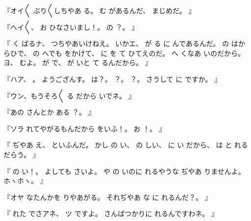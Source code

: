 『オイ〳〵
ぶり〳〵しちやあ
る。
む
があるんだ、
まじめだ。
』

『ヘイ〳〵、
お
ひなさいまし！。
の
？。
』

『
く
ばるナ、
つちやあいけねえ。
いかエ、
が
る
に
んであるんだ。
の
はからひで、
の
へでも
をかけて、
に
を
て
ひてえのだ。
へ
くなあ
いのだから。
ヨ、
むよ。
が
で、
が
いと
て
るんだから。
』

『ハア、
。
ようござんす。
は？。
？。
？。
さうして
に
ですか。
』

『ウン、もうそろ〳〵
る
だから
いでネ。
』

『あの
さんとか
ある
？。
』

『ソラ
れてやがるもんだから
をいふ！。
お
！。
』

『
ぢやあ
え、
といふんだ。
かし
の
い、
の
しい、
に
い
だから、
は
と
れるだらう。
』

『
の
い！。
よしても
さいよ。
や
の
いのに
れるやうな
ぢやあ
りませんよ。
ホヽホヽ。
』

『オヤ
なたんかを
りやあがる。
それぢやあ
な
に
れるんだ？。
』

『
れた
でさアネ、
ツ
ですよ。
さんばつかりに
れるんですわネ。
』

